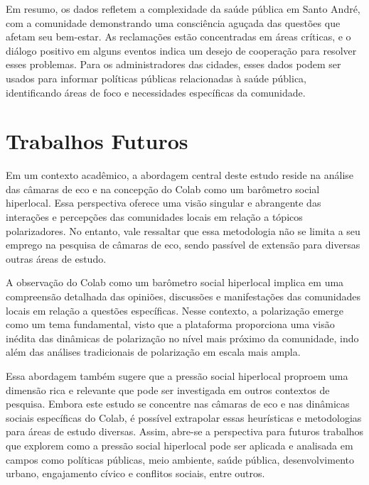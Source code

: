 Em resumo, os dados refletem a complexidade da saúde pública em Santo André, com a comunidade demonstrando uma consciência aguçada das questões que afetam seu bem-estar. As reclamações estão concentradas em áreas críticas, e o diálogo positivo em alguns eventos indica um desejo de cooperação para resolver esses problemas. Para os administradores das cidades, esses dados podem ser usados para informar políticas públicas relacionadas à saúde pública, identificando áreas de foco e necessidades específicas da comunidade.

\section{Trabalhos Futuros}

Em um contexto acadêmico, a abordagem central deste estudo reside na análise das câmaras de eco e na concepção do Colab como um barômetro social hiperlocal. Essa perspectiva oferece uma visão singular e abrangente das interações e percepções das comunidades locais em relação a tópicos polarizadores. No entanto, vale ressaltar que essa metodologia não se limita a seu emprego na pesquisa de câmaras de eco, sendo passível de extensão para diversas outras áreas de estudo.

A observação do Colab como um barômetro social hiperlocal implica em uma compreensão detalhada das opiniões, discussões e manifestações das comunidades locais em relação a questões específicas. Nesse contexto, a polarização emerge como um tema fundamental, visto que a plataforma proporciona uma visão inédita das dinâmicas de polarização no nível mais próximo da comunidade, indo além das análises tradicionais de polarização em escala mais ampla.

Essa abordagem também sugere que a pressão social hiperlocal proproem uma dimensão rica e relevante que pode ser investigada em outros contextos de pesquisa. Embora este estudo se concentre nas câmaras de eco e nas dinâmicas sociais específicas do Colab, é possível extrapolar essas heurísticas e metodologias para áreas de estudo diversas. Assim, abre-se a perspectiva para futuros trabalhos que explorem como a pressão social hiperlocal pode ser aplicada e analisada em campos como políticas públicas, meio ambiente, saúde pública, desenvolvimento urbano, engajamento cívico e conflitos sociais, entre outros.

